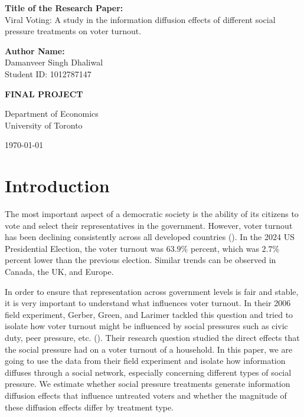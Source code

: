 \documentclass[11pt]{article}
\begin{document}
\begin{titlepage}
    \centering
    \vspace*{2cm}
    
    \vspace{0.5cm}

    \Large{\textbf{Title of the Research Paper:}}\\
    Viral Voting: A study in the information diffusion effects of different social pressure treatments on voter turnout.
    
    \vspace{0.5cm}

    \Large{\textbf{Author Name:}}\\
    \Large{Damanveer Singh Dhaliwal}\\
    \Large{Student ID: 1012787147}

    \vspace{0.5cm}
    
    \Large{\textbf{FINAL PROJECT}}
    
    \vfill
    
    \large{Department of Economics}\\
    \large{University of Toronto}
    
    \vspace{0.8cm}
    
    \large{\today}
\end{titlepage}

\section{Introduction}
The most important aspect of a democratic society is the ability of its citizens to vote and select their representatives in the government. However, voter turnout has been declining consistently across all developed countries (\cite{solijonov_voter_nodate}). In the 2024 US Presidential Election, the voter turnout was $63.9\%$ percent, which was $2.7\%$ percent lower than the previous election. Similar trends can be observed in Canada, the UK, and Europe.

In order to ensure that representation across government levels is fair and stable, it is very important to understand what influences voter turnout. In their 2006 field experiment, Gerber, Green, and Larimer tackled this question and tried to isolate how voter turnout might be influenced by social pressures such as civic duty, peer pressure, etc. (\cite{gerber_social_2008}). Their research question studied the direct effects that the social pressure had on a voter turnout of a household. In this paper, we are going to use the data from their field experiment and isolate how information diffuses through a social network, especially concerning different types of social pressure. We estimate whether social pressure treatments generate information diffusion effects that influence untreated voters and whether the magnitude of these diffusion effects differ by treatment type.
\end{document}
